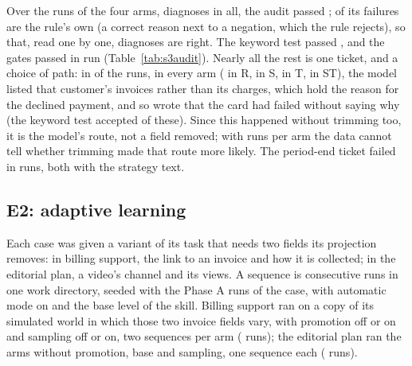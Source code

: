 Over the \AuditEOneRuns{} runs of the four arms, \AuditEOneFacts{} diagnoses in all, the audit passed
\AuditEOneAudit; \AuditEOneRuleCaused{} of its failures are the rule's own (a correct reason next to a negation, which
the rule rejects), so that, read one by one, \AuditEOneByHand{} diagnoses are right. The keyword test passed
\AuditEOneKeyword, and the gates passed in \AuditEOneGates{} run (Table~\ref{tab:s3audit}). Nearly all the rest is
one ticket, and a choice of path: in \AuditEOneMissing{} of the \AuditEOneRuns{} runs, in every arm
(\AuditEOneMissingR{} in R, \AuditEOneMissingS{} in S, \AuditEOneMissingT{} in T, \AuditEOneMissingST{} in ST),
the model listed that customer's invoices rather than its charges, which hold the reason for the declined payment,
and so wrote that the card had failed without saying why (the keyword test accepted \AuditEOneKeywordMissed{} of
these). Since this happened without trimming too, it is the model's route, not a field removed; with
\SthreeRunsPerArmEOne{} runs per arm the data cannot tell whether trimming made that route more likely. The
period-end ticket failed in \AuditEOnePeriod{} runs, both with the strategy text.

\begin{table}[t]
\centering\small

\caption{E1, billing support, post hoc (a deviation: required by \texttt{protocol-v04.md}, run after the results).
Five tickets per run. Keyword test: the frozen test of the protocol. Audit: the stricter rules of Studies~1 and~2
on the diagnosis alone (Table~\ref{tab:c4audit}), unchanged; total, and per run as median [min--max]. Decline reason
missing: runs whose answer does not say why the payment was declined, read one by one, with the rule's own failures
set aside. Readings one by one were made by the AI agent that ran the audit, under the author's review.}
\label{tab:s3audit}
\end{table}

\subsection{E2: adaptive learning}
\label{sec:s3e2}

Each case was given a variant of its task that needs two fields its projection removes: in billing support, the
link to an invoice and how it is collected; in the editorial plan, a video's channel and its views. A sequence is
\SthreeETwoSequenceLength{} consecutive runs in one work directory, seeded with the \PhaseARunsi{} Phase A runs
of the case, with automatic mode on and the base level of the skill. Billing support ran on a copy of its simulated
world in which those two invoice fields vary, with promotion off or on and sampling off or on, two sequences per
arm (\SthreeRunsETwoSim{} runs); the editorial plan ran the arms without promotion, base and sampling, one sequence
each (\SthreeRunsETwoReal{} runs).


